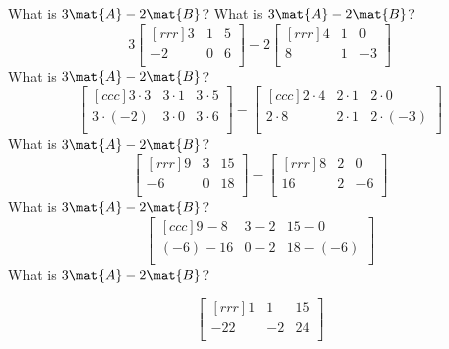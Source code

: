 \documentclass{beamer}
\begin{document}
\begin{frame}
\begin{example}
\vspace{-3mm}
\begin{overprint}
What is $3\mat{A}-2\mat{B}$?
What is $3\mat{A}-2\mat{B}$?
\begin{equation*}
3
\begin{bmatrix}[rrr]
3 & 1 & 5 \\
-2 & 0 & 6 \\
\end{bmatrix}
-2
\begin{bmatrix}[rrr]
4 & 1 & 0 \\
8 & 1 & -3 \\
\end{bmatrix}
\end{equation*}
What is $3\mat{A}-2\mat{B}$?
\begin{equation*}
\begin{bmatrix}[ccc]
3\cdot 3 & 3\cdot 1 & 3\cdot 5 \\
3\cdot (-2) & 3\cdot 0 & 3\cdot 6 \\
\end{bmatrix}
-
\begin{bmatrix}[ccc]
2\cdot 4 & 2\cdot 1 & 2\cdot 0 \\
2\cdot 8 & 2\cdot 1 & 2\cdot (-3) \\
\end{bmatrix}
\end{equation*}
What is $3\mat{A}-2\mat{B}$?
\begin{equation*}
\begin{bmatrix}[rrr]
9 & 3 & 15 \\
-6 & 0 & 18 \\
\end{bmatrix}
-
\begin{bmatrix}[rrr]
8 & 2 & 0 \\
16 & 2 & -6 \\
\end{bmatrix}
\end{equation*}
What is $3\mat{A}-2\mat{B}$?
\begin{equation*}
\begin{bmatrix}[ccc]
9-8 & 3-2 & 15-0 \\
(-6)-16 & 0-2 & 18-
(-6) \\
\end{bmatrix}
\end{equation*}
What is $3\mat{A}-2\mat{B}$?

\begin{equation*}
\begin{bmatrix}[rrr]
1 & 1 & 15 \\
-22 & -2 & 24 \\
\end{bmatrix}
\end{equation*}
\end{overprint}
\end{example}
\end{frame}
\end{document}
